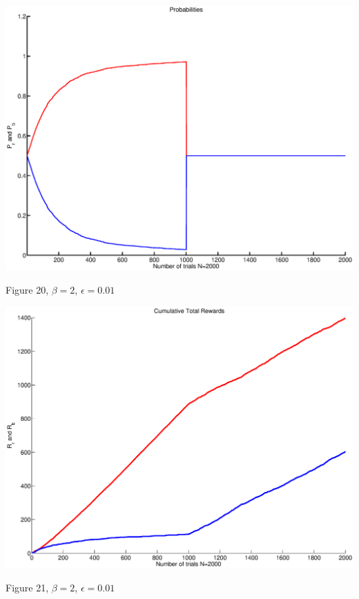 \documentclass{article}
\begin{document}
\begin{center}
\includegraphics[width=\textwidth]{d_prob3.eps}
\begin{footnotesize}
 Figure 20, $\beta=2$, $\epsilon=0.01$
\end{footnotesize}
\end{center}

\begin{center}
\includegraphics[width=\textwidth]{d_rew3.eps}
\begin{footnotesize}
 Figure 21, $\beta=2$, $\epsilon=0.01$
\end{footnotesize}
\end{center}
\end{document}
